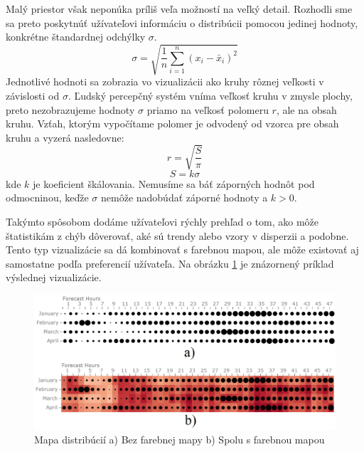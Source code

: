 Malý priestor však neponúka príliš veľa možností na veľký detail. Rozhodli sme sa preto poskytnúť užívateľovi informáciu o distribúcii pomocou jedinej hodnoty, konkrétne štandardnej odchýlky $ \sigma $. 
\[
	\sigma = \sqrt{\frac{1}{n} \sum_{i=1}^{n}(x_{i} - \bar{x}_{i})^2  }
\]
Jednotlivé hodnoti sa zobrazia vo vizualizácii ako kruhy rôznej veľkosti v závislosti od $ \sigma $. Ľudský percepčný systém vníma veľkosť kruhu v zmysle plochy, preto nezobrazujeme hodnoty $ \sigma $ priamo na veľkosť polomeru $ r $, ale na obsah kruhu. Vzťah, ktorým vypočítame polomer je odvodený od vzorca pre obsah kruhu a vyzerá nasledovne:
\[
	r = \sqrt{\frac{S}{\pi}}
\]
\[
	S = k\sigma
\]
kde $ k $ je koeficient škálovania. Nemusíme sa báť záporných hodnôt pod odmocninou, keďže $ \sigma $ nemôže nadobúdať záporné hodnoty a $ k > 0 $.

Takýmto spôsobom dodáme užívateľovi rýchly prehľad o tom, ako môže štatistikám z chýb dôverovať, aké sú trendy alebo vzory v disperzii a podobne. Tento typ vizualizácie sa dá kombinovať s farebnou mapou, ale môže existovať aj samostatne podľa preferencií užívateľa. Na obrázku \ref{fig:distributionmap} je znázornený príklad výslednej vizualizácie.


\begin{figure}
	\centering
	\includegraphics[width = 5.5in]{distributionmap}
	\caption{Mapa distribúcií a) Bez farebnej mapy b) Spolu s farebnou mapou} 
	\label{fig:distributionmap}
\end{figure}



